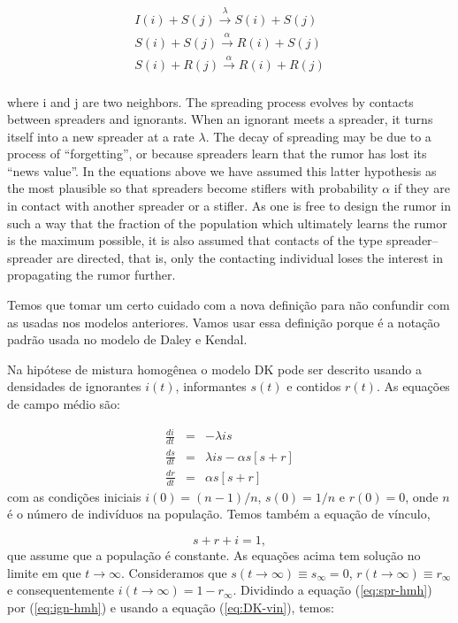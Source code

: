 \documentclass[]{article}
\begin{document}
\begin{eqnarray}
I(i)+S(j)\stackrel{\lambda}{\longrightarrow} S(i)+S(j)\\
S(i)+S(j)\stackrel{\alpha}{\longrightarrow} R(i)+S(j)\\
S(i)+R(j)\stackrel{\alpha}{\longrightarrow} R(i)+R(j)\\
\end{eqnarray}

where i and j are two neighbors. The spreading process evolves by contacts between spreaders and ignorants. When an ignorant meets a spreader, it turns itself into a new spreader at a rate $\lambda$. The decay of spreading may be due to a process of “forgetting”, or because spreaders learn that the rumor has lost its “news value”. In the equations above we have assumed this latter hypothesis as the most plausible so that spreaders become stiflers with probability $\alpha$ if they are in contact with another spreader or a stifler. As one is free to design the rumor in such a way that the fraction of the population which ultimately learns the rumor is the maximum possible, it is also assumed that contacts of the type spreader–spreader are directed, that is, only the contacting individual loses the interest in propagating the rumor further.

Temos que tomar um certo cuidado com a nova defini\c{c}\~ao para n\~ao confundir com as usadas nos modelos anteriores. Vamos usar essa defini\c{c}\~ao porque \'e a nota\c{c}\~ao padr\~ao usada no modelo de Daley e Kendal.

Na hip\'otese de mistura homog\^enea o modelo DK pode ser descrito usando a densidades de ignorantes $i(t)$, informantes $s(t)$ e contidos $r(t)$. As equa\c{c}\~oes de campo m\'edio s\~ao:

\begin{eqnarray}
\frac{di}{dt}&=&-\lambda i s \label{eq:ign-hmh}\\
\frac{ds}{dt}&=&\lambda i s -\alpha s[s+r]\label{eq:spr-hmh} \\
\frac{dr}{dt}&=&\alpha s[s+r] \label{eq:sti-hmh}
\end{eqnarray}
com as condi\c{c}\~oes iniciais $i(0)=(n-1)/n$, $s(0)=1/n$ e $r(0)=0$, onde $n$	\'e o n\'umero de indiv\'iduos na popula\c{c}\~ao. Temos tamb\'em a equa\c{c}\~ao de v\'inculo, 

\begin{equation}
s+r+i=1,
\label{eq:DK-vin}
\end{equation}
que assume que a popula\c{c}\~ao \'e constante. As equa\c{c}\~oes acima tem solu\c{c}\~ao no limite em que $t\to \infty$. Consideramos que $s(t\to \infty)\equiv s_{\infty}=0$, $r(t \to \infty)\equiv r_{\infty}$ e consequentemente $i(t\to \infty)=1-r_{\infty}$. Dividindo a equa\c{c}\~ao (\ref{eq:spr-hmh}) por (\ref{eq:ign-hmh}) e usando a equa\c{c}\~ao (\ref{eq:DK-vin}), temos:
\end{document}
